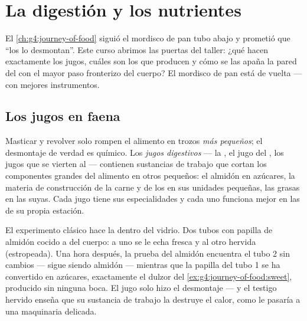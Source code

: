 \chapter{La digestión y los nutrientes}\label{ch:g7:digestion-and-nutrients}

El \cref{ch:g4:journey-of-food} siguió el mordisco de pan tubo abajo y
prometió que ``los  lo desmontan''. Este curso abrimos
las puertas del taller: ¿qué hacen exactamente los jugos, cuáles son
los  que producen y cómo se las apaña la pared del  con el mayor paso fronterizo del cuerpo? El mordisco de pan
está de vuelta --- con mejores instrumentos.

\section{Los jugos en faena}

\begin{proposition}\label{prop:g7:digestion-and-nutrients:chemical}
Masticar y revolver solo rompen el alimento en trozos \emph{más
pequeños}; el desmontaje de verdad es químico. Los \emph{jugos
digestivos} --- la , el jugo del ,
los jugos que se vierten al  --- contienen sustancias
de trabajo que cortan los componentes grandes del alimento en otros
pequeños: el almidón en azúcares, la materia de construcción de la
carne y de los  en sus unidades pequeñas, las grasas en las
suyas. Cada jugo tiene sus especialidades y cada uno funciona mejor en
las  de su propia estación.
\end{proposition}
\admitted

\begin{example}\label{ex:g7:digestion-and-nutrients:bench}
El experimento clásico hace la  dentro del vidrio. Dos tubos
con papilla de almidón cocido a  del cuerpo: a uno se le
echa  fresca y al otro  hervida (estropeada). Una hora
después, la prueba del almidón encuentra el tubo 2 sin cambios ---
sigue siendo almidón --- mientras que la papilla del tubo 1 se ha
convertido en azúcares, exactamente el dulzor del
\cref{ex:g4:journey-of-food:sweet}, producido sin ninguna boca. El jugo
solo hizo el desmontaje --- y el testigo hervido enseña que su
sustancia de trabajo la destruye el calor, como le pasaría a una
maquinaria delicada.
\end{example}

